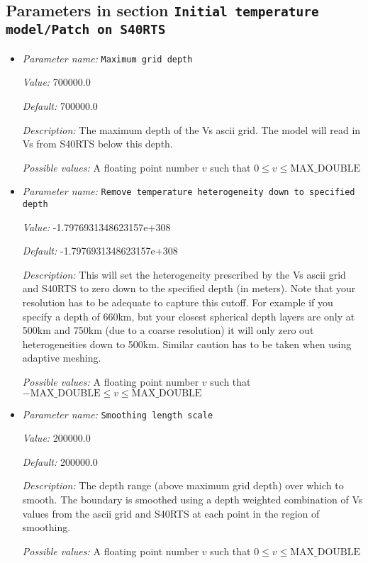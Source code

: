 \subsection{Parameters in section \tt Initial temperature model/Patch on S40RTS}
\label{parameters:Initial_20temperature_20model/Patch_20on_20S40RTS}

\begin{itemize}
\item {\it Parameter name:} {\tt Maximum grid depth}
\label{parameters:Initial temperature model/Patch on S40RTS/Maximum grid depth}


{\it Value:} 700000.0


{\it Default:} 700000.0


{\it Description:} The maximum depth of the Vs ascii grid. The model will read in  Vs from S40RTS below this depth.


{\it Possible values:} A floating point number $v$ such that $0 \leq v \leq \text{MAX\_DOUBLE}$
\item {\it Parameter name:} {\tt Remove temperature heterogeneity down to specified depth}
\label{parameters:Initial temperature model/Patch on S40RTS/Remove temperature heterogeneity down to specified depth}


{\it Value:} -1.7976931348623157e+308


{\it Default:} -1.7976931348623157e+308


{\it Description:} This will set the heterogeneity prescribed by the Vs ascii grid and S40RTS to zero down to the specified depth (in meters). Note that your resolution has to be adequate to capture this cutoff. For example if you specify a depth of 660km, but your closest spherical depth layers are only at 500km and 750km (due to a coarse resolution) it will only zero out heterogeneities down to 500km. Similar caution has to be taken when using adaptive meshing.


{\it Possible values:} A floating point number $v$ such that $-\text{MAX\_DOUBLE} \leq v \leq \text{MAX\_DOUBLE}$
\item {\it Parameter name:} {\tt Smoothing length scale}
\label{parameters:Initial temperature model/Patch on S40RTS/Smoothing length scale}


{\it Value:} 200000.0


{\it Default:} 200000.0


{\it Description:} The depth range (above maximum grid depth) over which to smooth. The boundary is smoothed using a depth weighted combination of Vs values from the ascii grid and S40RTS at each point in the region of smoothing.


{\it Possible values:} A floating point number $v$ such that $0 \leq v \leq \text{MAX\_DOUBLE}$
\end{itemize}

